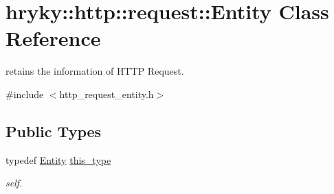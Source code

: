 \hypertarget{classhryky_1_1http_1_1request_1_1_entity}{\section{hryky\-:\-:http\-:\-:request\-:\-:Entity Class Reference}
\label{classhryky_1_1http_1_1request_1_1_entity}
}


retains the information of H\-T\-T\-P Request.  




{\ttfamily \#include $<$http\-\_\-request\-\_\-entity.\-h$>$}

\subsection*{Public Types}
\begin{DoxyCompactItemize}
\item 
\hypertarget{classhryky_1_1http_1_1request_1_1_entity_ab4ff6edca126070d13656b4fd74942ec}{typedef \hyperlink{classhryky_1_1http_1_1request_1_1_entity}{Entity} \hyperlink{classhryky_1_1http_1_1request_1_1_entity_ab4ff6edca126070d13656b4fd74942ec}{this\-\_\-type}}\label{classhryky_1_1http_1_1request_1_1_entity_ab4ff6edca126070d13656b4fd74942ec}

\begin{DoxyCompactList}\small\item\em self. \end{DoxyCompactList}\end{DoxyCompactItemize}
